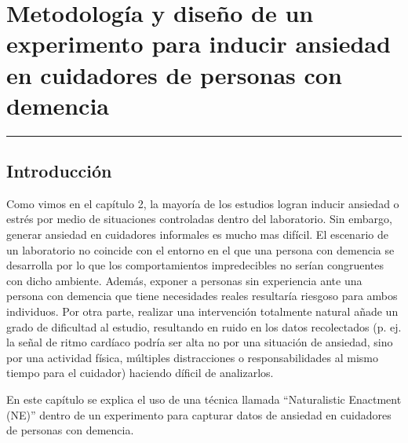 \chapter{Metodolog\'ia y dise\~no de un experimento para inducir ansiedad en cuidadores de personas con demencia}\label{capit:cap3}
\vspace{-2.0325ex}%
\noindent
\rule{\textwidth}{0.5pt}
\vspace{-5.5ex}%
\newcommand{\pushline}{\Indp}%
\section{Introducci\'on}\label{secc:introduction}

Como vimos en el cap\'itulo 2, la mayor\'ia de los estudios logran inducir ansiedad o estr\'es por medio de situaciones controladas dentro del laboratorio. Sin embargo, generar ansiedad en cuidadores informales es mucho mas dif\'icil. El escenario de un laboratorio no coincide con el entorno en el que una persona con demencia se desarrolla por lo que los comportamientos impredecibles no ser\'ian congruentes con dicho ambiente. Adem\'as, exponer a personas sin experiencia ante una persona con demencia que tiene necesidades reales resultar\'ia riesgoso para ambos individuos. Por otra parte, realizar una intervenci\'on totalmente natural a\~nade un grado de dificultad al estudio, resultando en ruido en los datos recolectados (p. ej. la se\~nal de ritmo card\'iaco podr\'ia ser alta no por una situaci\'on de ansiedad, sino por una actividad f\'isica, m\'ultiples distracciones o responsabilidades al mismo tiempo para el cuidador) haciendo d\'ificil de analizarlos.

En este cap\'itulo se explica el uso de una t\'ecnica llamada ``Naturalistic Enactment (NE)'' dentro de un experimento para capturar datos de ansiedad en cuidadores de personas con demencia.

